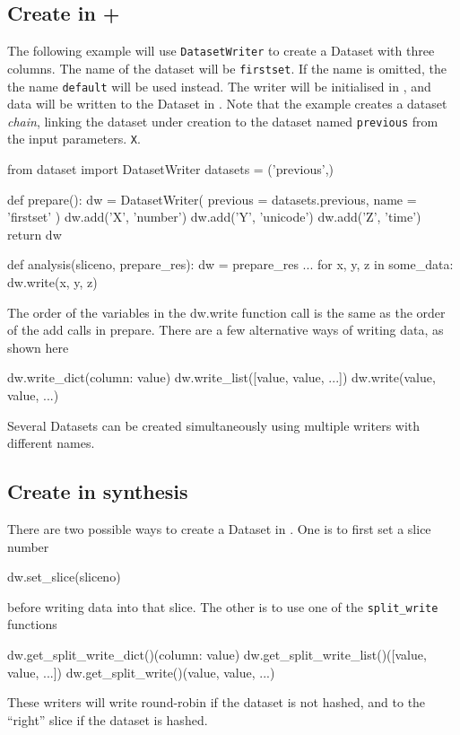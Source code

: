 \subsection{Create in \prepare + \analysis}
\label{sec:create_dataset_in_analysis}

The following example will use \texttt{DatasetWriter} to create a
Dataset with three columns.  The name of the dataset will be
\texttt{firstset}.  If the name is omitted, the the name
\texttt{default} will be used instead.  The writer will be initialised
in \prepare, and data will be written to the Dataset in \analysis.
Note that the example creates a dataset \emph{chain}, linking the
dataset under creation to the dataset named \texttt{previous} from the
input parameters.
\texttt{X}.
\begin{python}
from dataset import DatasetWriter
datasets = ('previous',)

def prepare():
    dw = DatasetWriter(
        previous = datasets.previous,
        name = 'firstset'
    )
    dw.add('X', 'number')
    dw.add('Y', 'unicode')
    dw.add('Z', 'time')
    return dw

def analysis(sliceno, prepare_res):
    dw = prepare_res
    ...
    for x, y, z in some_data:
        dw.write(x, y, z)
\end{python}
The order of the variables in the dw.write function call is the same
as the order of the add calls in prepare.  There are a few alternative
ways of writing data, as shown here
\begin{python}
dw.write_dict({column: value})
dw.write_list([value, value, ...])
dw.write(value, value, ...)
\end{python}
Several Datasets can be created simultaneously using multiple writers
with different names.



\clearpage
\subsection{Create in synthesis}

There are two possible ways to create a Dataset in \synthesis.  One is
to first set a slice number
\begin{python}
dw.set_slice(sliceno)
\end{python}
before writing data into that slice.  The other is to use one of
the \texttt{split\_write} functions
\begin{python}
dw.get_split_write_dict()({column: value})
dw.get_split_write_list()([value, value, ...])
dw.get_split_write()(value, value, ...)
\end{python}
These writers will write round-robin if the dataset is not hashed, and
to the ``right'' slice if the dataset is hashed.




